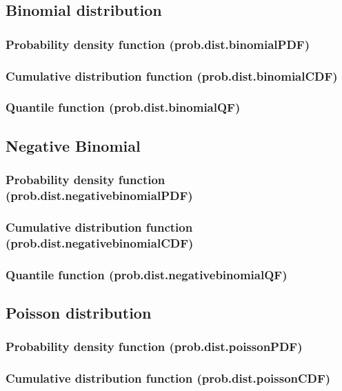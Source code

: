 \documentclass{article}
\theoremstyle{definition}
\begin{document}
\subsection{Binomial distribution}
\subsubsection{Probability density function (prob.dist.binomialPDF)}
\subsubsection{Cumulative distribution function (prob.dist.binomialCDF)}
\subsubsection{Quantile function (prob.dist.binomialQF)}

\subsection{Negative Binomial}
\subsubsection{Probability density function (prob.dist.negativebinomialPDF)}
\subsubsection{Cumulative distribution function (prob.dist.negativebinomialCDF)}
\subsubsection{Quantile function (prob.dist.negativebinomialQF)}

\subsection{Poisson distribution}
\subsubsection{Probability density function (prob.dist.poissonPDF)}
\subsubsection{Cumulative distribution function (prob.dist.poissonCDF)}
\end{document}
